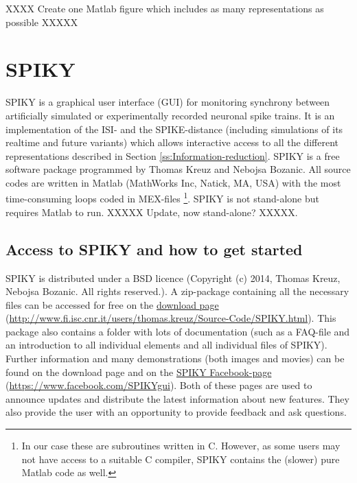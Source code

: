 \documentclass[10pt,twocolumn]{elsart5p}
\begin{document}
XXXX Create one Matlab figure which includes as many representations as possible XXXXX

%
%
%
%
\section{\label{s:SPIKY} SPIKY}

SPIKY is a graphical user interface (GUI) for monitoring synchrony between artificially simulated or experimentally recorded neuronal spike trains. It is an implementation of the ISI- and the SPIKE-distance (including simulations of its realtime and future variants) which allows  interactive access to all the different representations described in Section \ref{ss:Information-reduction}. SPIKY is a free software package programmed by Thomas Kreuz and Nebojsa Bozanic. All source codes are written in Matlab (MathWorks Inc, Natick, MA, USA) with the most time-consuming loops coded in MEX-files \footnote{In our case these are subroutines written in C. However, as some users may not have access to a suitable C compiler, SPIKY contains the (slower) pure Matlab code as well.}. SPIKY is not stand-alone but requires Matlab to run. XXXXX Update, now stand-alone? XXXXX.


\subsection{\label{ss:Access} Access to SPIKY and how to get started}

SPIKY is distributed under a BSD licence (Copyright (c) 2014, Thomas Kreuz, Nebojsa Bozanic. All rights reserved.). A zip-package containing all the necessary files can be accessed for free on the \href{http://www.fi.isc.cnr.it/users/thomas.kreuz/Source-Code/SPIKY.html}{download page} (\url{http://www.fi.isc.cnr.it/users/thomas.kreuz/Source-Code/SPIKY.html}). This package also contains a folder with lots of documentation (such as a FAQ-file and an introduction to all individual elements and all individual files of SPIKY). Further information and many demonstrations (both images and movies) can be found on the download page and on the \href{https://www.facebook.com/SPIKYgui}{SPIKY Facebook-page} (\url{https://www.facebook.com/SPIKYgui}). Both of these pages are used to announce updates and distribute the latest information about new features. They also provide the user with an opportunity to provide feedback and ask questions.
\end{document}
